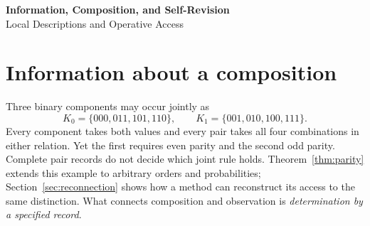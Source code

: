 \documentclass[11pt]{article}
\begin{document}
\begin{center}
{\Large\bfseries Information, Composition, and Self-Revision}\\[4pt]
{\large Local Descriptions and Operative Access}
\end{center}
\vspace{-5pt}
\thispagestyle{plain}
\begin{abstract}
Local descriptions can permit a global invariant without determining whether the realised composition satisfies it. We characterise that distinction for finite relations and probability marginals, using one parity family in both settings. A linear-record criterion identifies when a specified transition has the same output law for every compatible input. Applied to an observing method, it yields equivalent conditions under which adaptive reconstruction preserves an observational ambiguity. An exact finite belief-state criterion addresses whether available actions can resolve an initial-state decision without irreversibly erasing needed distinctions. A reconnection example and a destructive-experiment counterexample separate these cases; a version-bound workflow applies the criteria to composed operations. Chemical and quantum examples delimit interpretation. The results distinguish a joint invariant from evidence for it, and a method's immediate access from its reachable repertoire. Neither mathematical compatibility nor successful inquiry certifies the model's premises, authorises the operation, or establishes improvement.
\end{abstract}

\section{Information about a composition}\label{sec:relations}
Three binary components may occur jointly as
\label{eq:three}
\[
K_0=\{000,011,101,110\},\qquad K_1=\{001,010,100,111\}.
\]
Every component takes both values and every pair takes all four combinations in either relation. Yet the first requires even parity and the second odd parity. Complete pair records do not decide which joint rule holds. Theorem~\ref{thm:parity} extends this example to arbitrary orders and probabilities; Section~\ref{sec:reconnection} shows how a method can reconstruct its access to the same distinction. What connects composition and observation is \emph{determination by a specified record}.
\end{document}
